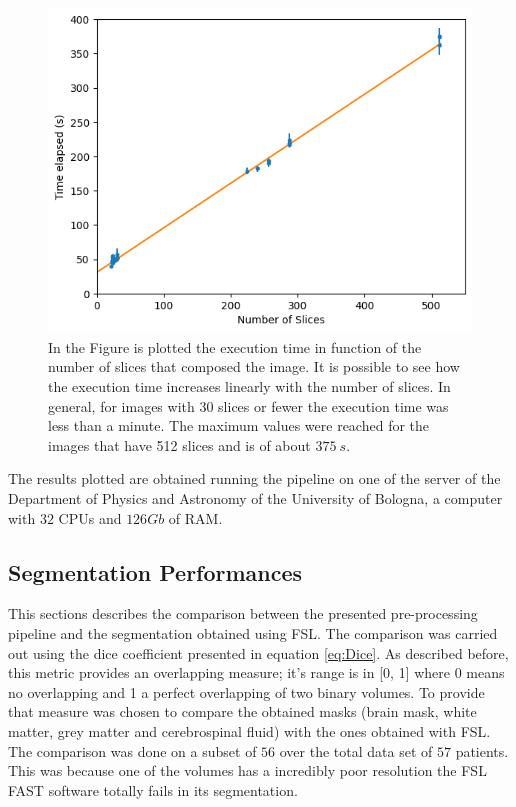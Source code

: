 \documentclass{standalone}
\begin{document}
\begin{figure}[h!]
    \centering
    \includegraphics[scale = 0.9]{img/Chap3/times.png}
    \caption{In the Figure is plotted the execution time in function of the number of slices that composed the image. It is possible to see how the execution time increases linearly with the number of slices. In general, for images with 30 slices or fewer the execution time was less than a minute. The maximum values were reached for the images that have 512 slices and is of about $375 \ s$.}
    \label{fig:time_pre}
\end{figure}

The results plotted are obtained running the pipeline on one of the server of the Department of Physics and Astronomy of the University of Bologna, a computer with $32$ CPUs and $126Gb$ of RAM.


\subsection{Segmentation Performances}

This sections describes the comparison between the presented pre-processing pipeline and the segmentation obtained using FSL. The comparison was carried out using the dice coefficient presented in equation \ref{eq:Dice}. As described before, this metric provides an overlapping measure; it's range is in [0, 1] where 0 means no overlapping and 1 a perfect overlapping of two binary  volumes.
To provide that measure was chosen to compare the obtained masks (brain mask, white matter, grey matter and cerebrospinal fluid) with the ones obtained with FSL.
The comparison was done on a subset of $56$ over the total data set of $57$ patients. This was because one of the volumes has a incredibly poor resolution the FSL FAST software totally fails in its segmentation.
\end{document}

